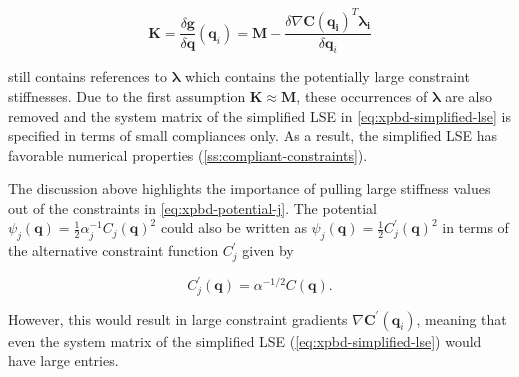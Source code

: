 \begin{equation}\label{eq:xpbd-K}
    \bm{K} = \frac{\delta \bm{g}}{\delta \bm{q}}(\bm{q}_i) = \bm{M} - \frac{\delta \nabla \bm{C}(\bm{q_i})^T \bm{\lambda_i}}{\delta \bm{q}_i}
\end{equation}

\noindent still contains references to $\bm{\lambda}$ which contains the potentially large constraint stiffnesses. Due to the first assumption $\bm{K} 
\approx \bm{M}$, these occurrences of $\bm{\lambda}$ are also removed and the system matrix of the simplified LSE in 
\cref{eq:xpbd-simplified-lse} is specified in terms of small compliances only. As a result, the simplified LSE has favorable numerical properties 
(\cref{ss:compliant-constraints}).

The discussion above highlights the importance of pulling large stiffness values out of the constraints in \cref{eq:xpbd-potential-j}. The potential
$\psi_j(\bm{q}) = \frac{1}{2} \alpha^{-1}_j C_j(\bm{q})^2$ could also be written as $\psi_j(\bm{q}) = \frac{1}{2} C^{\prime}_j(\bm{q})^2$ in terms of 
the alternative constraint function $C^{\prime}_j$ given by

\[
    C^{\prime}_j(\bm{q}) = \alpha^{-1/2}C(\bm{q}).
\]

\noindent However, this would result in large constraint gradients $\nabla \bm{C}^{\prime}(\bm{q}_i)$, meaning that even the system matrix of the simplified LSE
(\cref{eq:xpbd-simplified-lse}) would have large entries.

